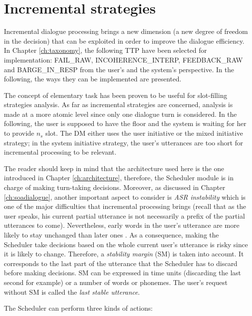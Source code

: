 \section{Incremental strategies}
\label{sec:incrstrat}

     Incremental dialogue processing brings a new dimension (a new degree of freedom in the decision) that can be exploited in order to improve the dialogue efficiency. In Chapter \ref{ch:taxonomy}, the following TTP have been selected for implementation: FAIL\_RAW, INCOHERENCE\_INTERP, FEEDBACK\_RAW and BARGE\_IN\_RESP from the user's and the system's perspective. In the following, the ways they can be implemented are presented.

     The concept of elementary task has been proven to be useful for slot-filling strategies analysis. As far as incremental strategies are concerned, analysis is made at a more atomic level since only one dialogue turn is considered. In the following, the user is supposed to have the floor and the system is waiting for her to provide $n_s$ slot. The DM either uses the user initiative or the mixed initiative strategy; in the system initiative strategy, the user's utterances are too short for incremental processing to be relevant.

     The reader should keep in mind that the architecture used here is the one introduced in Chapter \ref{ch:architecture}, therefore, the Scheduler module is in charge of making turn-taking decisions. Moreover, as discussed in Chapter \ref{ch:soadialogue}, another important aspect to consider is \textit{ASR instability} which is one of the major difficulties that incremental processing brings (recall that as the user speaks, his current partial utterance is not necessarily a prefix of the partial utterances to come). Nevertheless, early words in the user's utterance are more likely to stay unchanged than later ones \cite{McGraw2012}. As a consequence, making the Scheduler take decisions based on the whole current user's utterance is risky since it is likely to change. Therefore, a \textit{stability margin} (SM) is taken into account. It corresponds to the last part of the utterance that the Scheduler has to discard before making decisions. SM can be expressed in time units (discarding the last second for example) or a number of words or phonemes. The user's request without SM is called the \textit{last stable utterance}.
		
     The Scheduler can perform three kinds of actions:

